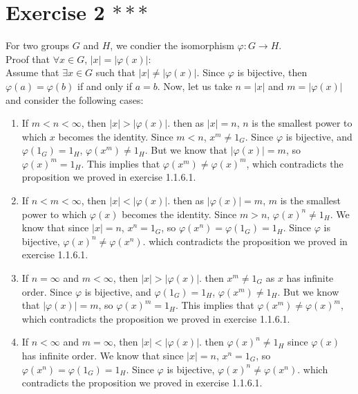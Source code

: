 \documentclass{article}
\begin{document}
    \section*{Exercise 2 $***$}
    For two groups $G$ and $H$,
    we condier the isomorphism $\varphi: G \to H$. \\ 
    Proof that $\forall x \in G$, $|x| = |\varphi(x)|$: \\
    Assume that $\exists x \in G$
    such that  $|x| \neq |\varphi(x)|$.
    Since $\varphi$ is bijective,
    then $\varphi(a) = \varphi(b)$ if and only if $a = b$.
    Now, let us take $n = |x|$ and $m = |\varphi(x)|$
    and consider the following cases:
    \begin{enumerate}[label=\textbf{case \arabic*:}]
        \item
            If $m < n < \infty$,
            then $|x| > |\varphi(x)|$.
            then as $|x| = n$,
            $n$ is the smallest power to which $x$ becomes the identity.
            Since $m < n$, $x^m \neq 1_G$.
            Since $\varphi$ is bijective,
            and $\varphi(1_G) = 1_H$,
            $\varphi(x^m) \neq 1_H$.
            But we know that $|\varphi(x)| = m$,
            so $\varphi(x)^m = 1_H$.
            This implies that $\varphi(x^m) \neq \varphi(x)^m$,
            which contradicts the proposition we proved in exercise 1.1.6.1.
        \item 
            If $n < m < \infty$,
            then $|x| < |\varphi(x)|$.
            then as $|\varphi(x)| = m$,
            $m$ is the smallest power to which $\varphi(x)$ becomes the
            identity.
            Since $m > n$, $\varphi(x)^n \neq 1_H$.
            We know that since $|x| = n$, $x^n = 1_G$,
            so $\varphi(x^n) = \varphi(1_G) = 1_H$. 
            Since $\varphi$ is bijective,
            $\varphi(x)^n \neq \varphi(x^n)$.
            which contradicts the proposition we proved in exercise 1.1.6.1.
        \item
            If $n = \infty$ and $m < \infty$,
            then $|x| > |\varphi(x)|$.
            then $x^m \neq 1_G$ as $x$ has infinite order.
            Since $\varphi$ is bijective,
            and $\varphi(1_G) = 1_H$,
            $\varphi(x^m) \neq 1_H$.
            But we know that $|\varphi(x)| = m$,
            so $\varphi(x)^m = 1_H$.
            This implies that $\varphi(x^m) \neq \varphi(x)^m$,
            which contradicts the proposition we proved in exercise 1.1.6.1.
        \item
            If $n < \infty$ and $m = \infty$,
            then $|x| < |\varphi(x)|$.
            then $\varphi(x)^n \neq 1_H$
            since $\varphi(x)$ has infinite order.
            We know that since $|x| = n$, $x^n = 1_G$,
            so $\varphi(x^n) = \varphi(1_G) = 1_H$. 
            Since $\varphi$ is bijective,
            $\varphi(x)^n \neq \varphi(x^n)$.
            which contradicts the proposition we proved in exercise 1.1.6.1.
    \end{enumerate}   
\end{document}
